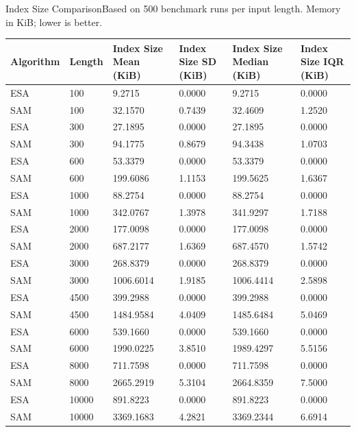\begin{benchmarktable}{Index Size Comparison}{Based on 500 benchmark runs per input length. Memory in KiB; lower is better.}
\begin{tabularx}{\textwidth}{|X|X|X|X|X|X|}
\toprule
Algorithm & Length & Index Size Mean (KiB) & Index Size SD (KiB) & Index Size Median (KiB) & Index Size IQR (KiB) \\
\midrule
ESA & 100 & 9.2715 & 0.0000 & 9.2715 & 0.0000 \\
SAM & 100 & 32.1570 & 0.7439 & 32.4609 & 1.2520 \\
\hline
ESA & 300 & 27.1895 & 0.0000 & 27.1895 & 0.0000 \\
SAM & 300 & 94.1775 & 0.8679 & 94.3438 & 1.0703 \\
\hline
ESA & 600 & 53.3379 & 0.0000 & 53.3379 & 0.0000 \\
SAM & 600 & 199.6086 & 1.1153 & 199.5625 & 1.6367 \\
\hline
ESA & 1000 & 88.2754 & 0.0000 & 88.2754 & 0.0000 \\
SAM & 1000 & 342.0767 & 1.3978 & 341.9297 & 1.7188 \\
\hline
ESA & 2000 & 177.0098 & 0.0000 & 177.0098 & 0.0000 \\
SAM & 2000 & 687.2177 & 1.6369 & 687.4570 & 1.5742 \\
\hline
ESA & 3000 & 268.8379 & 0.0000 & 268.8379 & 0.0000 \\
SAM & 3000 & 1006.6014 & 1.9185 & 1006.4414 & 2.5898 \\
\hline
ESA & 4500 & 399.2988 & 0.0000 & 399.2988 & 0.0000 \\
SAM & 4500 & 1484.9584 & 4.0409 & 1485.6484 & 5.0469 \\
\hline
ESA & 6000 & 539.1660 & 0.0000 & 539.1660 & 0.0000 \\
SAM & 6000 & 1990.0225 & 3.8510 & 1989.4297 & 5.5156 \\
\hline
ESA & 8000 & 711.7598 & 0.0000 & 711.7598 & 0.0000 \\
SAM & 8000 & 2665.2919 & 5.3104 & 2664.8359 & 7.5000 \\
\hline
ESA & 10000 & 891.8223 & 0.0000 & 891.8223 & 0.0000 \\
SAM & 10000 & 3369.1683 & 4.2821 & 3369.2344 & 6.6914 \\
\bottomrule
\end{tabularx}
\end{benchmarktable}
